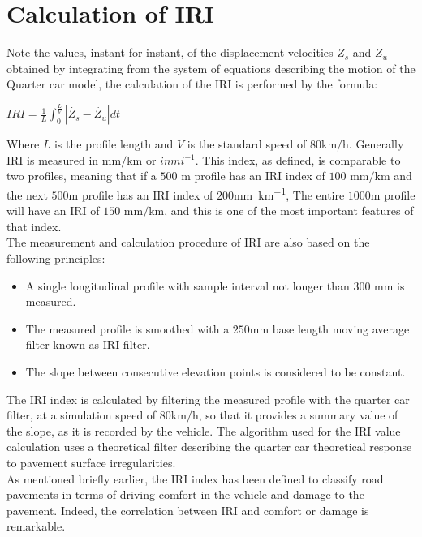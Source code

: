 \documentclass{standalone}
\begin{document}
\section{Calculation of IRI}\label{Calculation of IRI}
Note the values, instant for instant, of the displacement velocities $Z_{s}$  and $Z_{u}$ obtained by integrating from the system of equations describing the motion of the Quarter car model, the calculation of the IRI is performed by the formula:
\begin{center}
{\LARGE $IRI = \frac{1}{L} \int_{0}^{\frac{L}{V}} | \dot{Z_{s}} - \dot{Z_{u}} | dt$}
\end{center}


\noindent Where $L$ is the profile length and $V$ is the standard speed of $\num{80} \si{\km\per\hour}$. Generally IRI is measured in $\si{\milli\meter\per\km}$ or $in mi^{-1}$. This index, as defined, is comparable to two profiles, meaning that if a $500$ $\si{\meter}$ profile has an IRI index of $100$ $\si{\milli\meter\per\km}$ and the next $500$\si{\meter} profile has an IRI index of $200$\si{\milli\meter\per\km}, The entire $1000$\si{\meter} profile will have an IRI of $150$ $\si{\milli\meter\per\km}$, and this is one of the most important features of that index\cite{little_book}. \\

\noindent The measurement and calculation procedure of IRI are also based on the following principles:
\begin{itemize}

\item A single longitudinal profile with sample interval not longer than $300$ $\si{\milli\meter}$ is measured.
\item The measured profile is smoothed with a $250$\si{\milli\meter} base length moving average filter known as IRI filter.
\item The slope between consecutive elevation points is considered to be constant.

\end{itemize}
\noindent The IRI index is calculated by filtering the measured profile with the quarter car filter, at a simulation speed of $\num{80} \si{\km\per\hour}$, so that it provides a summary value of the slope, as it is recorded by the vehicle. The algorithm used for the IRI value calculation uses a theoretical filter describing the quarter car theoretical response to pavement surface irregularities.
\\
\noindent As mentioned briefly earlier, the IRI index has been defined to classify road pavements in terms of driving comfort in the vehicle and damage to the pavement. Indeed, the correlation between IRI and comfort or damage is remarkable\cite{gillespie1992everything}.\\
\end{document}
